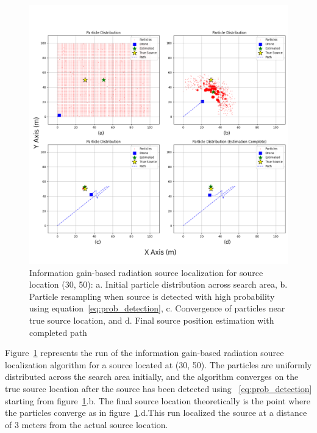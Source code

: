 \documentclass[../report.tex]{subfiles}
\begin{document}
    \begin{figure}[ht]
        \centering
        \includegraphics[width=\linewidth]{figures/entropy_algorithm_with_label.png}
        \caption{Information gain-based radiation source localization for source location (30, 50): a. Initial particle distribution across search area, 
        b. Particle resampling when source is detected with high probability using equation~\ref{eq:prob_detection}, 
        c. Convergence of particles near true source location, and 
        d. Final source position estimation with completed path}
        \label{fig:entropy_algorithm_with_plot}
    \end{figure}

    Figure~\ref{fig:entropy_algorithm_with_plot} represents the run of the information gain-based radiation source localization algorithm for a source located at (30, 50). The 
    particles are uniformly distributed across the search area initially, and the algorithm converges on the true source location after the source has been detected using ~\ref{eq:prob_detection} starting 
    from figure~\ref{fig:entropy_algorithm_with_plot}.b. The final source location theoretically is the point where the  particles converge as in figure~\ref{fig:entropy_algorithm_with_plot}.d.This 
    run localized the source at a distance of 3 meters from the actual source location.
\end{document}
